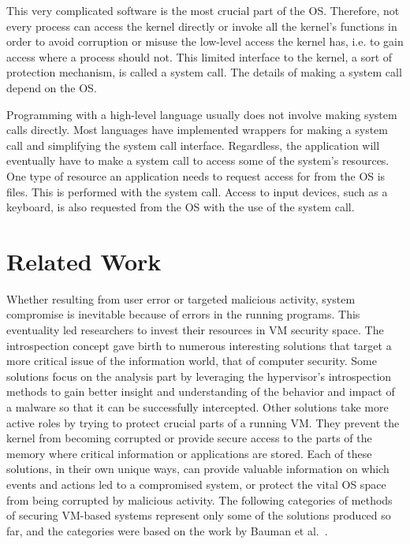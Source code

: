 \par This very complicated software is the most crucial part of the \ac{OS}. Therefore, not every process can access the kernel directly or invoke all the kernel's functions in order to avoid corruption or misuse the low-level access the kernel has, i.e. to gain access where a process should not. This limited interface to the kernel, a sort of protection mechanism, is called a system call. The details of making a system call depend on the \ac{OS}.

\par Programming with a high-level language usually does not involve making system calls directly. Most languages have implemented wrappers for making a system call and simplifying the system call interface. Regardless, the application will eventually have to make a system call to access some of the system's resources. One type of resource an application needs to request access for from the \ac{OS} is files. This is performed with the  system call. Access to input devices, such as a keyboard, is also requested from the \ac{OS} with the use of the  system call.

\section{Related Work}\label{sec:related}

\par Whether resulting from user error or targeted malicious activity, system compromise is inevitable because of errors in the running programs. This eventuality led researchers to invest their resources in \ac{VM} security space. The introspection concept gave birth to numerous interesting solutions that target a more critical issue of the information world, that of computer security. Some solutions focus on the analysis part by leveraging the hypervisor's introspection methods to gain better insight and understanding of the behavior and impact of a malware so that it can be successfully intercepted. Other solutions take more active roles by trying to protect crucial parts of a running \ac{VM}. They prevent the kernel from becoming corrupted or provide secure access to the parts of the memory where critical information or applications are stored. 
Each of these solutions, in their own unique ways, can provide valuable information on which events and actions led to a compromised system, or protect the vital \ac{OS} space from being corrupted by malicious activity. 
The following categories of methods of securing \ac{VM}-based systems represent only some of the solutions produced so far, and the categories were based on the work by Bauman et al.~\cite{bauman2015survey}.

